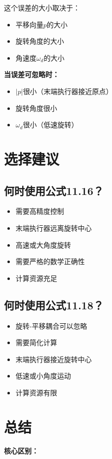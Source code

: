 \documentclass[12pt,a4paper]{article}
\begin{document}
这个误差的大小取决于：
\begin{itemize}
\item 平移向量$p$的大小
\item 旋转角度的大小
\item 角速度$\omega_d$的大小
\end{itemize}

\textbf{当误差可忽略时：}
\begin{itemize}
\item $|p|$很小（末端执行器接近原点）
\item 旋转角度很小
\item $\omega_d$很小（低速旋转）
\end{itemize}

\section{选择建议}

\subsection{何时使用公式11.16？}

\begin{itemize}
\item 需要高精度控制
\item 末端执行器远离旋转中心
\item 高速或大角度旋转
\item 需要严格的数学正确性
\item 计算资源充足
\end{itemize}

\subsection{何时使用公式11.18？}

\begin{itemize}
\item 旋转-平移耦合可以忽略
\item 需要简化计算
\item 末端执行器接近旋转中心
\item 低速或小角度运动
\item 计算资源有限
\end{itemize}

\section{总结}

\textbf{核心区别：}
\end{document}
